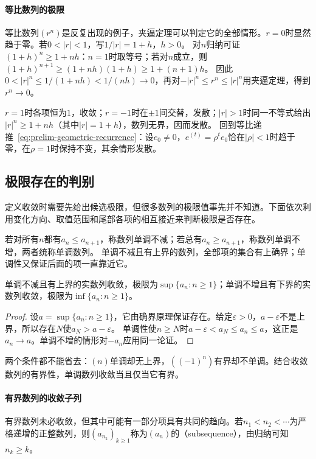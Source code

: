 \paragraph{等比数列的极限}
等比数列$(r^n)$是反复出现的例子，夹逼定理可以判定它的全部情形。$r=0$时显然趋于零。若$0<|r|<1$，写$1/|r|=1+h$，$h>0$。
对$n$归纳可证$(1+h)^n\geq1+nh$：$n=1$时取等号；若对$n$成立，则$(1+h)^{n+1}\geq(1+nh)(1+h)\geq1+(n+1)h$。
因此$0<|r|^n\leq1/(1+nh)<1/(nh)\to0$，再对$-|r|^n\leq r^n\leq|r|^n$用夹逼定理，得到$r^n\to0$。

$r=1$时各项恒为$1$，收敛；$r=-1$时在$\pm1$间交替，发散；$|r|>1$时同一不等式给出$|r|^n\geq1+nh$（其中$|r|=1+h$），数列无界，因而发散。
回到等比递推~\eqref{eq:prelim-geometric-recurrence}：设$e_0\neq0$，$e^{(t)}=\rho^te_0$恰在$|\rho|<1$时趋于零，在$\rho=1$时保持不变，其余情形发散。

\subsection{极限存在的判别}
\label{sec:ru-limit-existence}

定义收敛时需要先给出候选极限，但很多数列的极限值事先并不知道。下面依次利用变化方向、取值范围和尾部各项的相互接近来判断极限是否存在。

若对所有$n$都有$a_n\leq a_{n+1}$，称数列单调不减；若总有$a_n\geq a_{n+1}$，称数列单调不增，两者统称单调数列。
单调不减且有上界的数列，全部项的集合有上确界；单调性又保证后面的项一直靠近它。
\begin{theorem}[单调有界收敛定理]
\label{thm:analysis-monotone-bounded-sequence}
单调不减且有上界的实数列收敛，极限为$\sup\{a_n:n\geq1\}$；单调不增且有下界的实数列收敛，极限为$\inf\{a_n:n\geq1\}$。
\end{theorem}
\begin{proof}
设$a=\sup\{a_n:n\geq1\}$，它由确界原理保证存在。给定$\varepsilon>0$，$a-\varepsilon$不是上界，所以存在$N$使$a_N>a-\varepsilon$。
单调性使$n\geq N$时$a-\varepsilon<a_N\leq a_n\leq a$，这正是$a_n\to a$。单调不增的情形对$-a_n$应用同一论证。
\end{proof}
两个条件都不能省去：$(n)$单调却无上界，$((-1)^n)$有界却不单调。结合收敛数列的有界性，单调数列收敛当且仅当它有界。

\paragraph{有界数列的收敛子列}
有界数列未必收敛，但其中可能有一部分项具有共同的趋向。若$n_1<n_2<\cdots$为严格递增的正整数列，则$(a_{n_k})_{k\geq1}$称为$(a_n)$的（subsequence），由归纳可知$n_k\geq k$。

